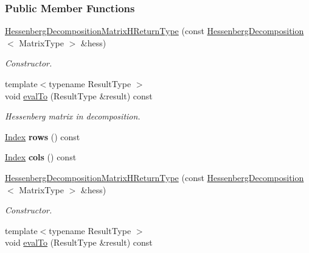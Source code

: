 \subsubsection*{Public Member Functions}
\begin{DoxyCompactItemize}
\item 
\hyperlink{group___eigenvalues___module_aa6d46d84c1343c964c50457ca4ddf9fa}{Hessenberg\+Decomposition\+Matrix\+H\+Return\+Type} (const \hyperlink{group___eigenvalues___module_class_eigen_1_1_hessenberg_decomposition}{Hessenberg\+Decomposition}$<$ Matrix\+Type $>$ \&hess)
\begin{DoxyCompactList}\small\item\em Constructor. \end{DoxyCompactList}\item 
{\footnotesize template$<$typename Result\+Type $>$ }\\void \hyperlink{group___eigenvalues___module_a7f1d84113072d2d2e507d3821ff9f15c}{eval\+To} (Result\+Type \&result) const
\begin{DoxyCompactList}\small\item\em Hessenberg matrix in decomposition. \end{DoxyCompactList}\item 
\mbox{\label{group___eigenvalues___module_ad0a6e19c33a4feb42b7ced19ea9aa28b}} 
\hyperlink{namespace_eigen_a62e77e0933482dafde8fe197d9a2cfde}{Index} {\bfseries rows} () const
\item 
\mbox{\label{group___eigenvalues___module_a1a5dc498ba22dd3c627701548b2da6a1}} 
\hyperlink{namespace_eigen_a62e77e0933482dafde8fe197d9a2cfde}{Index} {\bfseries cols} () const
\item 
\hyperlink{group___eigenvalues___module_aa6d46d84c1343c964c50457ca4ddf9fa}{Hessenberg\+Decomposition\+Matrix\+H\+Return\+Type} (const \hyperlink{group___eigenvalues___module_class_eigen_1_1_hessenberg_decomposition}{Hessenberg\+Decomposition}$<$ Matrix\+Type $>$ \&hess)
\begin{DoxyCompactList}\small\item\em Constructor. \end{DoxyCompactList}\item 
{\footnotesize template$<$typename Result\+Type $>$ }\\void \hyperlink{group___eigenvalues___module_a7f1d84113072d2d2e507d3821ff9f15c}{eval\+To} (Result\+Type \&result) const

\end{DoxyCompactItemize}
